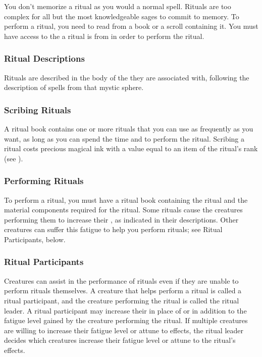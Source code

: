         You don't memorize a ritual as you would a normal spell.
        Rituals are too complex for all but the most knowledgeable sages to commit to memory.
        To perform a ritual, you need to read from a book or a scroll containing it.
        You must have access to the  a ritual is from in order to perform the ritual.

        \subsubsection{Ritual Descriptions}
            Rituals are described in the body of the  they are associated with, following the description of spells from that mystic sphere.

        \subsubsection{Scribing Rituals}
            A ritual book contains one or more rituals that you can use as frequently as you want, as long as you can spend the time and  to perform the ritual.
            Scribing a ritual costs precious magical ink with a value equal to an item of the ritual's rank (see ).

        \subsubsection{Performing Rituals}
            To perform a ritual, you must have a ritual book containing the ritual and the material components required for the ritual.
            Some rituals cause the creatures performing them to increase their , as indicated in their descriptions.
            Other creatures can suffer this fatigue to help you perform rituals; see Ritual Participants, below.


        \subsubsection{Ritual Participants}
            Creatures can assist in the performance of rituals even if they are unable to perform rituals themselves.
            A creature that helps perform a ritual is called a ritual participant, and the creature performing the ritual is called the ritual leader.
            A ritual participant may increase their  in place of or in addition to the fatigue level gained by the creature performing the ritual.
            If multiple creatures are willing to increase their fatigue level or attune to effects, the ritual leader decides which creatures increase their fatigue level or attune to the ritual's effects.

